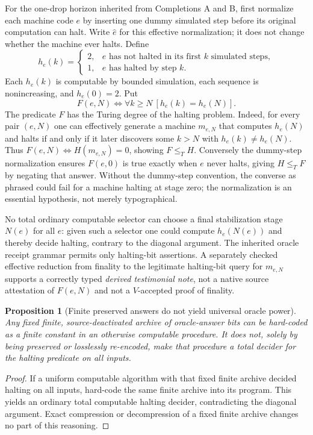 \documentclass[11pt,letterpaper]{article}
\newtheorem{proposition}[theorem]{Proposition}
\theoremstyle{definition}
\begin{document}
For the one-drop horizon inherited from Completions A and B, first normalize each machine code $e$ by inserting one dummy simulated step before its original computation can halt. Write $\widehat e$ for this effective normalization; it does not change whether the machine ever halts. Define
\[
h_e(k)=\begin{cases}2,&\widehat e\text{ has not halted in its first $k$ simulated steps},\\1,&\widehat e\text{ has halted by step $k$}.\end{cases}
\]
Each $h_e(k)$ is computable by bounded simulation, each sequence is nonincreasing, and $h_e(0)=2$. Put
\[
F(e,N)\iff \forall k\ge N\ [h_e(k)=h_e(N)].
\]
The predicate $F$ has the Turing degree of the halting problem. Indeed, for every pair $(e,N)$ one can effectively generate a machine $m_{e,N}$ that computes $h_e(N)$ and halts if and only if it later discovers some $k>N$ with $h_e(k)\ne h_e(N)$. Thus $F(e,N)\iff H(m_{e,N})=0$, showing $F\le_T H$. Conversely the dummy-step normalization ensures $F(e,0)$ is true exactly when $e$ never halts, giving $H\le_T F$ by negating that answer. Without the dummy-step convention, the converse as phrased could fail for a machine halting at stage zero; the normalization is an essential hypothesis, not merely typographical.

No total ordinary computable selector can choose a final stabilization stage $N(e)$ for all $e$: given such a selector one could compute $h_e(N(e))$ and thereby decide halting, contrary to the diagonal argument. The inherited oracle receipt grammar permits only halting-bit assertions. A separately checked effective reduction from finality to the legitimate halting-bit query for $m_{e,N}$ supports a correctly typed \emph{derived testimonial note}, not a native source attestation of $F(e,N)$ and not a $V$-accepted proof of finality.

\begin{proposition}[Finite preserved answers do not yield universal oracle power]
Any fixed finite, source-deactivated archive of oracle-answer bits can be hard-coded as a finite constant in an otherwise computable procedure. It does not, solely by being preserved or losslessly re-encoded, make that procedure a total decider for the halting predicate on all inputs.
\end{proposition}
\begin{proof}
If a uniform computable algorithm with that fixed finite archive decided halting on all inputs, hard-code the same finite archive into its program. This yields an ordinary total computable halting decider, contradicting the diagonal argument. Exact compression or decompression of a fixed finite archive changes no part of this reasoning.
\end{proof}
\end{document}
